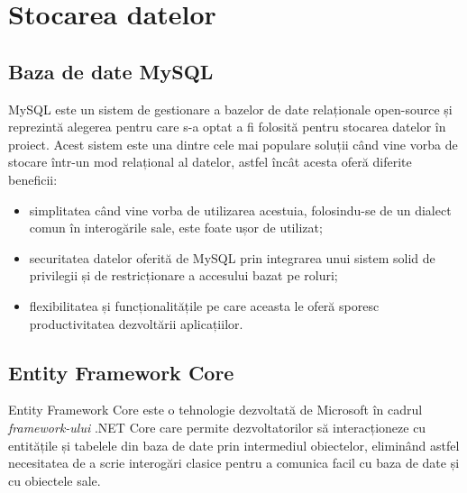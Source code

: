 \section{Stocarea datelor}

 \subsection*{Baza de date MySQL}
	MySQL este un sistem de gestionare a bazelor de date relaționale open-source și reprezintă alegerea pentru care s-a optat a fi folosită pentru stocarea datelor în proiect. Acest sistem este una dintre cele mai populare soluții când vine vorba de stocare într-un mod relațional al datelor, astfel încât acesta oferă diferite beneficii: 
	\begin{itemize}
		
		\item simplitatea când vine vorba de utilizarea acestuia, folosindu-se de un dialect comun în interogările sale, este foate ușor de utilizat;
		
		\item securitatea datelor oferită de MySQL prin integrarea unui sistem solid de privilegii și de restricționare a accesului bazat pe roluri;
		
		\item flexibilitatea și funcționalitățile pe care aceasta le oferă sporesc productivitatea dezvoltării aplicațiilor.
		
	\end{itemize} 
 
 \subsection*{Entity Framework Core}
Entity Framework Core este o tehnologie dezvoltată de Microsoft în cadrul \textit{framework-ului} .NET Core care permite dezvoltatorilor să interacționeze cu entitățile și tabelele din baza de date prin intermediul obiectelor, eliminând astfel necesitatea de a scrie interogări clasice pentru a comunica facil cu baza de date și cu obiectele sale.

